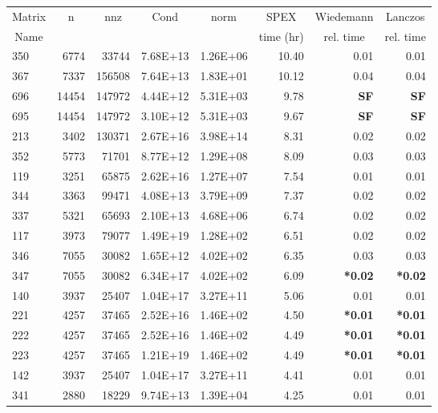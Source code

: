 \documentclass[10pt]{article}
\newcommand{\red}{
	\color{red}	
	}
\begin{document}
\begin{longtable}{|l|r|r|r|r|r|r|r|}
\hline	
\multicolumn{1}{|c|}{Matrix} &
\multicolumn{1}{c|}{n} &
\multicolumn{1}{c|}{nnz} &
\multicolumn{1}{c|}{Cond} &
\multicolumn{1}{c|}{norm} &
\multicolumn{1}{c|}{SPEX} &
\multicolumn{1}{c|}{Wiedemann} &
\multicolumn{1}{c|}{Lanczos}  \\
\multicolumn{1}{|c|}{Name} &
\multicolumn{1}{c|}{ } &
\multicolumn{1}{c|}{ } &
\multicolumn{1}{c|}{ } &
\multicolumn{1}{c|}{ } &
\multicolumn{1}{c|}{time (hr)} &
\multicolumn{1}{c|}{rel. time} &
\multicolumn{1}{c|}{rel. time } \\
\hline
\endhead
350	&	6774	&	33744	&	7.68E+13	&	1.26E+06	&	10.40	&	0.01	&	0.01	\\
367	&	7337	&	156508	&	7.64E+13	&	1.83E+01	&	10.12	&	0.04	&	0.04	\\
696	&	14454	&	147972	&	4.44E+12	&	5.31E+03	&	9.78	&	{\bf \red SF}	&	{\bf \red SF}	\\
695	&	14454	&	147972	&	3.10E+12	&	5.31E+03	&	9.67	&	{\bf \red SF}	&	{\bf \red SF}	\\
213	&	3402	&	130371	&	2.67E+16	&	3.98E+14	&	8.31	&	0.02	&	0.02	\\
352	&	5773	&	71701	&	8.77E+12	&	1.29E+08	&	8.09	&	0.03	&	0.03	\\
119	&	3251	&	65875	&	2.62E+16	&	1.27E+07	&	7.54	&	0.01	&	0.01	\\
344	&	3363	&	99471	&	4.08E+13	&	3.79E+09	&	7.37	&	0.02	&	0.02	\\
337	&	5321	&	65693	&	2.10E+13	&	4.68E+06	&	6.74	&	0.02	&	0.02	\\
117	&	3973	&	79077	&	1.49E+19	&	1.28E+02	&	6.51	&	0.02	&	0.02	\\
346	&	7055	&	30082	&	1.65E+12	&	4.02E+02	&	6.35	&	0.03	&	0.03	\\
347	&	7055	&	30082	&	6.34E+17	&	4.02E+02	&	6.09	&	{\bf \red *0.02}	&	{\bf \red *0.02}	\\
140	&	3937	&	25407	&	1.04E+17	&	3.27E+11	&	5.06	&	0.01	&	0.01	\\
221	&	4257	&	37465	&	2.52E+16	&	1.46E+02	&	4.50	&	{\bf \red *0.01}	&	{\bf \red *0.01}	\\
222	&	4257	&	37465	&	2.52E+16	&	1.46E+02	&	4.49	&	{\bf \red *0.01}	&	{\bf \red *0.01}	\\
223	&	4257	&	37465	&	1.21E+19	&	1.46E+02	&	4.49	&	{\bf \red *0.01}	&	{\bf \red *0.01}	\\
142	&	3937	&	25407	&	1.04E+17	&	3.27E+11	&	4.41	&	0.01	&	0.01	\\
341	&	2880	&	18229	&	9.74E+13	&	1.39E+04	&	4.25	&	0.01	&	0.01	\\

\end{longtable}
\end{document}
